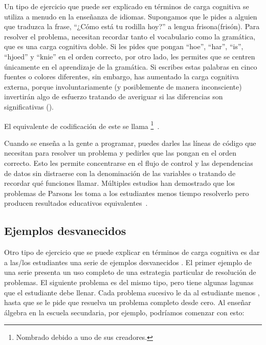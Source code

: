 Un tipo de ejercicio que puede ser explicado en términos de carga cognitiva
se utiliza a menudo en la enseñanza de idiomas.
Supongamos que le pides a alguien que traduzca la frase,
``¿Cómo está tu rodilla hoy?'' a lengua frisona(frisón).
Para resolver el problema, necesitan recordar tanto el vocabulario
como la gramática, que es una carga cognitiva doble.
Si les pides que pongan ``hoe'', ``har'', ``is'', ``hjoed'' y ``knie'' en el orden correcto,
por otro lado, les permites que se centren únicamente en el aprendizaje de la gramática.
Si escribes estas palabras en cinco fuentes o colores diferentes,
sin embargo, has aumentado la carga cognitiva externa, porque involuntariamente
(y posiblemente de manera inconsciente) invertirán algo de esfuerzo tratando de averiguar
si las diferencias son significativas ().


El equivalente de codificación de este
se llama \footnote{Nombrado debido a uno de sus creadores.}~\cite{Pars2006}.

Cuando se enseña a la gente a programar,
puedes darles las líneas de código que necesitan para resolver un problema
y pedirles que las pongan en el orden correcto.
Esto les permite concentrarse en el flujo de control y las dependencias de datos
sin distraerse con la denominación de las variables o tratando de recordar qué funciones llamar.
Múltiples estudios han demostrado que los problemas de Parsons les toma a los estudiantes menos tiempo resolverlo
pero producen resultados educativos equivalentes~\cite{Eric2017}.


\subsection*{Ejemplos desvanecidos}

Otro tipo de ejercicio que se puede explicar en términos de carga cognitiva
es dar a las/los estudiantes una serie de ejemplos desvanecidos .
El primer ejemplo de una serie presenta un uso completo de una estrategia
particular de resolución de problemas.
El siguiente problema es del mismo tipo,
pero tiene algunas lagunas que el estudiante debe llenar.
Cada problema sucesivo le da al estudiante menos ,
hasta que se le pide que resuelva un problema completo desde cero.
Al enseñar álgebra en la escuela secundaria,
por ejemplo,
podríamos comenzar con esto:


